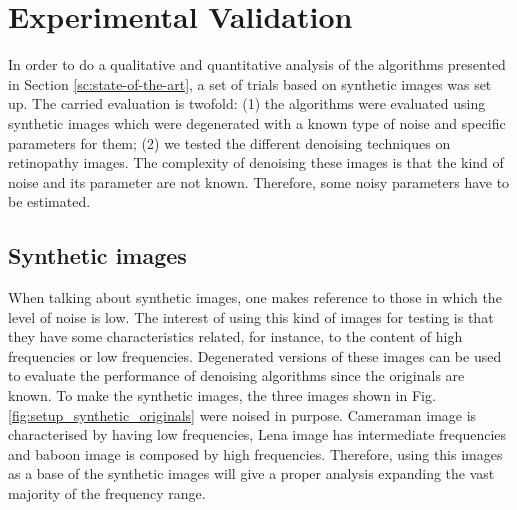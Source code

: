 \section{Experimental Validation} \label{sc:experimental-validation}
In order to do a qualitative and quantitative analysis of the algorithms presented in Section \ref{sc:state-of-the-art}, a set of trials based on synthetic images was set up. The carried evaluation is twofold: (1) the algorithms were evaluated using synthetic images which were degenerated with a known type of noise and specific parameters for them; (2) we tested the different denoising techniques on retinopathy images. The complexity of denoising these images is that the kind of noise and its parameter are not known. Therefore, some noisy parameters have to be estimated.

\subsection{Synthetic images} \label{sc:experimental_sythetic}
When talking about synthetic images, one makes reference to those in which the level of noise is low.  The interest of using this kind of images for testing is that they have some characteristics related, for instance, to the content of high frequencies or low frequencies. Degenerated versions of these images can be used to evaluate the performance of denoising algorithms since the originals are known. To make the synthetic images, the three images shown in Fig. \ref{fig:setup_synthetic_originals} were noised in purpose. Cameraman image is characterised by having low frequencies, Lena image has intermediate frequencies and baboon image is composed by high frequencies. Therefore, using this images as a base of the synthetic images will give a proper analysis expanding the vast majority of the frequency range.

